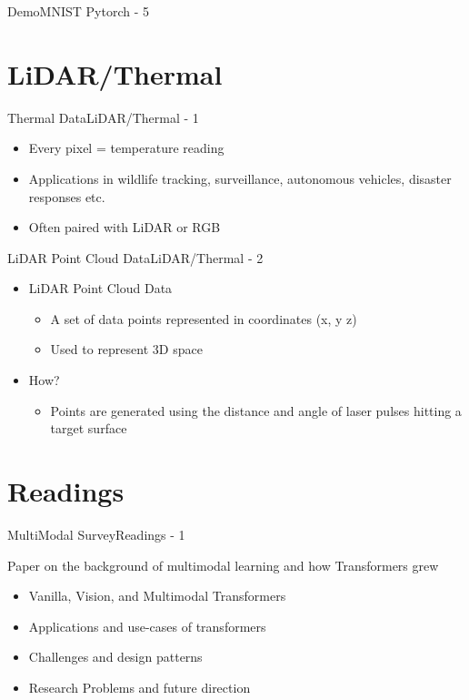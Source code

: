 \documentclass{beamer}
\begin{document}
		\begin{frame}{Demo}{MNIST Pytorch - 5}
		\end{frame}

	\section{LiDAR/Thermal}
		\begin{frame}{Thermal Data}{LiDAR/Thermal - 1}
			\begin{itemize}
				\item Every pixel = temperature reading
				\item Applications in wildlife tracking, surveillance, autonomous vehicles, disaster responses etc.
				\item Often paired with LiDAR or RGB 
			\end{itemize}
		\end{frame}

		\begin{frame}{LiDAR Point Cloud Data}{LiDAR/Thermal - 2}
			\begin{itemize}
				\item LiDAR Point Cloud Data
				\begin{itemize}
					\item A set of data points represented in coordinates (x, y z)
					\item Used to represent 3D space
				\end{itemize}
				\item How?
				\begin{itemize}
					\item Points are generated using the distance and angle of laser pulses hitting a target surface
				\end{itemize}
			\end{itemize}
		\end{frame}


	\section{Readings}
		\begin{frame}{MultiModal Survey}{Readings - 1}
			\begin{itemize}
				Paper on the background of multimodal learning and how Transformers grew
				\begin{itemize}
					\item Vanilla, Vision, and Multimodal Transformers
					\item Applications and use-cases of transformers
					\item Challenges and design patterns
					\item Research Problems and future direction
				\end{itemize}
			\end{itemize}
		\end{frame}
\end{document}

